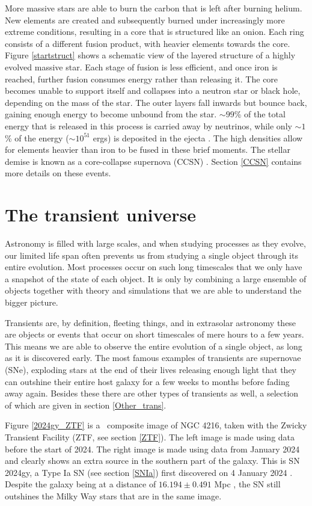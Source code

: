 \documentclass[a4paper,oneside,12pt, class=Latex/Classes/PhDthesisPSnPDF, crop=false]{standalone}
\begin{document}
More massive stars are able to burn the carbon that is left after burning helium. New elements are created and subsequently burned under increasingly more extreme conditions, resulting in a core that is structured like an onion. Each ring consists of a different fusion product, with heavier elements towards the core. Figure \ref{startstruct} shows a schematic view of the layered structure of a highly evolved massive star. Each stage of fusion is less efficient, and once iron is reached, further fusion consumes energy rather than releasing it. The core becomes unable to support itself and collapses into a neutron star or black hole, depending on the mass of the star. The outer layers fall inwards but bounce back, gaining enough energy to become unbound from the star. $\sim99$\% of the total energy that is released in this process is carried away by neutrinos, while only $\sim1$\% of the energy ($\sim10^{51}$ ergs) is deposited in the ejecta \citep{CCSN_neutrino_overview}. The high densities allow for elements heavier than iron to be fused in these brief moments. The stellar demise is known as a core-collapse supernova (CCSN) \citep{starstruct}. Section \ref{CCSN} contains more details on these events.


\section{The transient universe}
Astronomy is filled with large scales, and when studying processes as they evolve, our limited life span often prevents us from studying a single object through its entire evolution. Most processes occur on such long timescales that we only have a snapshot of the state of each object. It is only by combining a large ensemble of objects together with theory and simulations that we are able to understand the bigger picture.

Transients are, by definition, fleeting things, and in extrasolar astronomy these are objects or events that occur on short timescales of mere hours to a few years. This means we are able to observe the entire evolution of a single object, as long as it is discovered early. The most famous examples of transients are supernovae (SNe), exploding stars at the end of their lives releasing enough light that they can outshine their entire host galaxy for a few weeks to months before fading away again. Besides these there are other types of transients as well, a selection of which are given in section \ref{Other_trans}.

Figure \ref{2024gy_ZTF} is a \ztfg\ztfr\ztfi\ composite image of NGC 4216, taken with the Zwicky Transient Facility (ZTF, see section \ref{ZTF}). The left image is made using data before the start of 2024. The right image is made using data from January 2024 and clearly shows an extra source in the southern part of the galaxy. This is SN 2024gy, a Type Ia SN (see section \ref{SNIa}) first discovered on 4 January 2024 \citep{2024gy_disc}. Despite the galaxy being at a distance of $16.194 \pm 0.491$ Mpc \citep{2024gy_z}, the SN still outshines the Milky Way stars that are in the same image.
\end{document}
